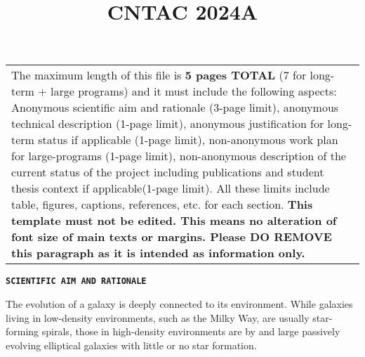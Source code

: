 \documentclass[12pt]{article}
\author{}
\title{CNTAC 2024A}
\begin{document}
{\raggedright

\vspace{3pt} \noindent
\begin{tabular}{|p{514pt}|}
\hline
\parbox{514pt} {\raggedright \vspace{3pt} The maximum length of this
  file is \textbf{5 pages TOTAL} (7 for long-term + large programs)
  and it must include the following aspects: Anonymous scientific aim and
  rationale (3-page limit), anonymous technical
  description (1-page limit), anonymous justification for long-term status if
  applicable (1-page limit), non-anonymous work plan for large-programs (1-page
  limit), non-anonymous description of the current status of the project including
  publications and student thesis context if applicable(1-page limit). All these limits include table, figures, captions, references, etc. for each section. \textbf{This template must not be edited. This means no
    alteration of font size of main texts or margins. Please DO REMOVE
    this paragraph as it is intended as information only. }} \\ \hline
\end{tabular}
\vspace{2pt}
}

\texttt{\textbf{SCIENTIFIC AIM AND RATIONALE} \\ }



The evolution of a galaxy is deeply connected to its environment. While galaxies living in low-density environments, such as the Milky Way, are usually star-forming spirals, those in high-density environments are by and large passively evolving elliptical galaxies with little or no star formation.
\end{document}
